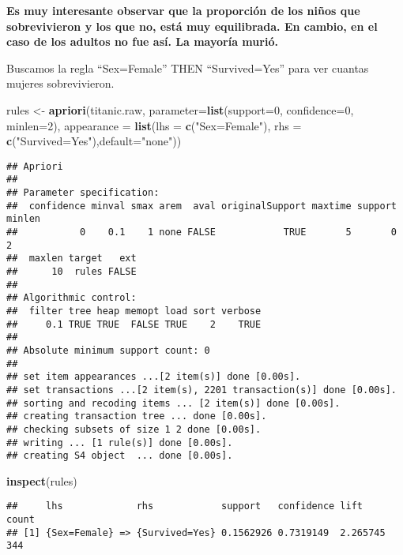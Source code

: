 \documentclass[]{article}
\newenvironment{Shaded}{\begin{snugshade}}{\end{snugshade}}
\newcommand{\DataTypeTok}[1]{\textcolor[rgb]{0.13,0.29,0.53}{#1}}
\newcommand{\DecValTok}[1]{\textcolor[rgb]{0.00,0.00,0.81}{#1}}
\newcommand{\KeywordTok}[1]{\textcolor[rgb]{0.13,0.29,0.53}{\textbf{#1}}}
\newcommand{\NormalTok}[1]{#1}
\newcommand{\StringTok}[1]{\textcolor[rgb]{0.31,0.60,0.02}{#1}}
\begin{document}
\textbf{Es muy interesante observar que la proporción de los niños que
sobrevivieron y los que no, está muy equilibrada. En cambio, en el caso
de los adultos no fue así. La mayoría murió.}

Buscamos la regla ``Sex=Female'' THEN ``Survived=Yes'' para ver cuantas
mujeres sobrevivieron.

\begin{Shaded}
\begin{Highlighting}[]
\NormalTok{rules <-}\StringTok{ }\KeywordTok{apriori}\NormalTok{(titanic.raw, }\DataTypeTok{parameter=}\KeywordTok{list}\NormalTok{(}\DataTypeTok{support=}\DecValTok{0}\NormalTok{, }\DataTypeTok{confidence=}\DecValTok{0}\NormalTok{, }\DataTypeTok{minlen=}\DecValTok{2}\NormalTok{), }
                 \DataTypeTok{appearance =} \KeywordTok{list}\NormalTok{(}\DataTypeTok{lhs =} \KeywordTok{c}\NormalTok{(}\StringTok{"Sex=Female"}\NormalTok{), }\DataTypeTok{rhs =} \KeywordTok{c}\NormalTok{(}\StringTok{"Survived=Yes"}\NormalTok{),}\DataTypeTok{default=}\StringTok{"none"}\NormalTok{))}
\end{Highlighting}
\end{Shaded}

\begin{verbatim}
## Apriori
## 
## Parameter specification:
##  confidence minval smax arem  aval originalSupport maxtime support minlen
##           0    0.1    1 none FALSE            TRUE       5       0      2
##  maxlen target   ext
##      10  rules FALSE
## 
## Algorithmic control:
##  filter tree heap memopt load sort verbose
##     0.1 TRUE TRUE  FALSE TRUE    2    TRUE
## 
## Absolute minimum support count: 0 
## 
## set item appearances ...[2 item(s)] done [0.00s].
## set transactions ...[2 item(s), 2201 transaction(s)] done [0.00s].
## sorting and recoding items ... [2 item(s)] done [0.00s].
## creating transaction tree ... done [0.00s].
## checking subsets of size 1 2 done [0.00s].
## writing ... [1 rule(s)] done [0.00s].
## creating S4 object  ... done [0.00s].
\end{verbatim}

\begin{Shaded}
\begin{Highlighting}[]
\KeywordTok{inspect}\NormalTok{(rules)}
\end{Highlighting}
\end{Shaded}

\begin{verbatim}
##     lhs             rhs            support   confidence lift     count
## [1] {Sex=Female} => {Survived=Yes} 0.1562926 0.7319149  2.265745 344
\end{verbatim}
\end{document}

